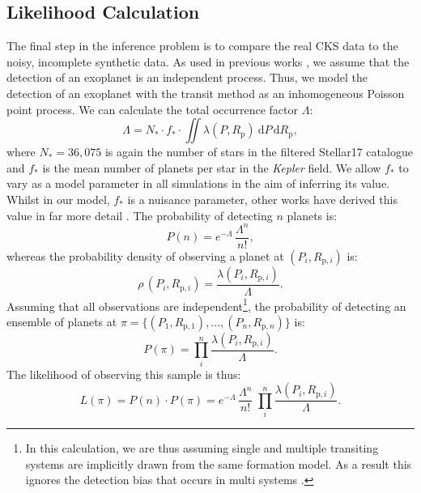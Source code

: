 \documentclass[fleqn,usenatbib]{mnras}
\begin{document}
\subsection{Likelihood Calculation} \label{sec:Likelihood}
The final step in the inference problem is to compare the real CKS data to the noisy, incomplete synthetic data. As used in previous works \citep[e.g.][]{ForemanMackey2014,Hsu2018,Bryson2020}, we assume that the detection of an exoplanet is an independent process. Thus, we model the detection of an exoplanet with the transit method as an inhomogeneous Poisson point process. We can calculate the total occurrence factor $\Lambda$:
\begin{equation} \label{eq:Lambda}
    \Lambda = N_* \cdot f_* \cdot \iint \lambda(P,R_\text{p}) \: \mathrm{d} P \, \mathrm{d} R_\text{p},
\end{equation}
where $N_* = 36,075$ is again the number of stars in the filtered Stellar17 catalogue and $f_*$ is the mean number of planets per star in the \textit{Kepler} field. We allow $f_*$ to vary as a model parameter in all simulations in the aim of inferring its value. Whilst in our model, $f_*$ is a nuisance parameter, other works have derived this value in far more detail \citep[e.g.][]{Howard2012,Fulton2017,Zhu2018,Zink2019,Hsu2019}. The probability of detecting $n$ planets is:
\begin{equation}
    P(n) = e^{-\Lambda} \, \frac{\Lambda^n}{n!},
\end{equation}
whereas the probability density of observing a planet at $(P_i, R_{\text{p},i})$ is:
\begin{equation} \label{eq:ProbDens}
    \rho\,(P_i, R_{\text{p},i}) = \frac{\lambda(P_i, R_{\text{p},i})}{\Lambda}.
\end{equation}
Assuming that all observations are independent\footnote{In this calculation, we are thus assuming single and multiple transiting systems are implicitly drawn from the same formation model. As a result this ignores the detection bias that occurs in multi systems \citep{Zink2019}. }, the probability of detecting an ensemble of planets at $\pi = \{(P_1, R_{\text{p},1}), ... , (P_n, R_{\text{p},n}) \}$ is:
\begin{equation}
    P(\pi) = \prod_i^n \frac{\lambda(P_i, R_{\text{p},i})}{\Lambda}.
\end{equation}
The likelihood of observing this sample is thus:
\begin{equation}
    L(\pi) = P(n) \cdot P(\pi) = e^{-\Lambda} \, \frac{\Lambda^n}{n!} \; \prod_i^n \frac{\lambda(P_i, R_{\text{p},i})}{\Lambda}.
\end{equation}
\end{document}
